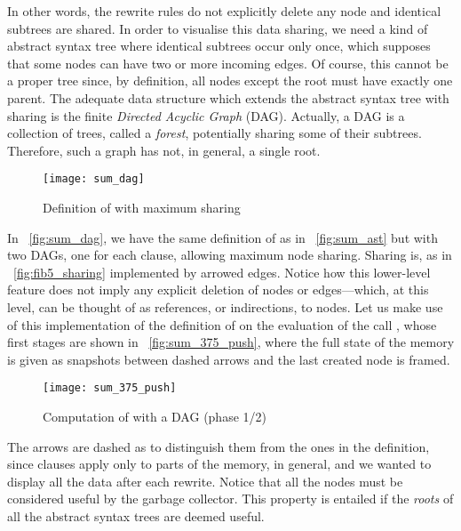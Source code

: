 In other words, the rewrite rules do not explicitly delete any node
and identical subtrees are shared. In order to visualise this data
sharing, we need a kind of abstract syntax tree where identical
subtrees occur only once, which supposes that some nodes can have two
or more incoming edges. Of course, this cannot be a proper tree since,
by definition, all nodes except the root must have exactly one
parent. The adequate data structure which extends the abstract syntax
tree with sharing is the finite \emph{Directed Acyclic Graph}
(DAG). Actually, a DAG is a collection of trees, called a
\emph{forest}, potentially sharing some of their subtrees. Therefore,
such a graph has not, in general, a single root.
\begin{figure}[b]
\centering
\texttt{[image: sum\_dag]}
\caption{Definition of  with maximum sharing
\label{fig:sum_dag}}
\end{figure}
In \fig~\vref{fig:sum_dag}, we have the same definition
of  as in \fig~\vref{fig:sum_ast} but with two DAGs,
one for each clause, allowing maximum node sharing. Sharing is, as in
\fig~\vref{fig:fib5_sharing} implemented by arrowed edges. Notice how
this lower\hyp{}level feature does not imply any explicit deletion of
nodes or edges---which, at this level, can be thought of as
references, or indirections, to nodes. Let us make use of this
implementation of the definition of  on the evaluation
of the call , whose first stages are shown in
\fig~\vref{fig:sum_375_push}, where the full state of the memory is
given as snapshots between dashed arrows and the last created node
 is framed.
\begin{figure}[t]
\centering
\texttt{[image: sum\_375\_push]}
\caption{Computation of  with a DAG (phase 1/2)
\label{fig:sum_375_push}}
\end{figure}
The arrows are dashed as to distinguish them from the ones in the
definition, since clauses apply only to parts of the memory, in
general, and we wanted to display all the data after each
rewrite. Notice that all the nodes must be considered useful by the
garbage collector. This property is entailed if the \emph{roots} of
all the abstract syntax trees are deemed useful.

